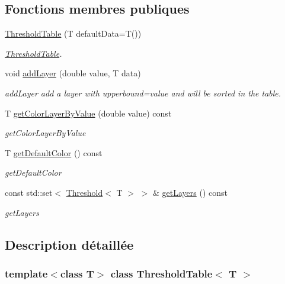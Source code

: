 \subsection*{Fonctions membres publiques}
\begin{DoxyCompactItemize}
\item 
\hyperlink{class_threshold_table_aed8c318959eca9a7f33944a8300b3e6a}{Threshold\+Table} (T default\+Data=T())
\begin{DoxyCompactList}\small\item\em \hyperlink{class_threshold_table}{Threshold\+Table}. \end{DoxyCompactList}\item 
void \hyperlink{class_threshold_table_a8724b07d34b3b1c84d4e6e6f2afdad37}{add\+Layer} (double value, T data)
\begin{DoxyCompactList}\small\item\em add\+Layer add a layer with upperbound=value and will be sorted in the table. \end{DoxyCompactList}\item 
T \hyperlink{class_threshold_table_a35e7219d9476c3a5c0362e80ab7f5596}{get\+Color\+Layer\+By\+Value} (double value) const
\begin{DoxyCompactList}\small\item\em get\+Color\+Layer\+By\+Value \end{DoxyCompactList}\item 
T \hyperlink{class_threshold_table_ac20ccb2dd4cd20e96036818ca0106f93}{get\+Default\+Color} () const
\begin{DoxyCompactList}\small\item\em get\+Default\+Color \end{DoxyCompactList}\item 
const std\+::set$<$ \hyperlink{struct_threshold}{Threshold}$<$ T $>$ $>$ \& \hyperlink{class_threshold_table_a6cb1745a571a4e071e9b74ad34372405}{get\+Layers} () const
\begin{DoxyCompactList}\small\item\em get\+Layers \end{DoxyCompactList}\end{DoxyCompactItemize}


\subsection{Description détaillée}
\subsubsection*{template$<$class T$>$\newline
class Threshold\+Table$<$ T $>$}

